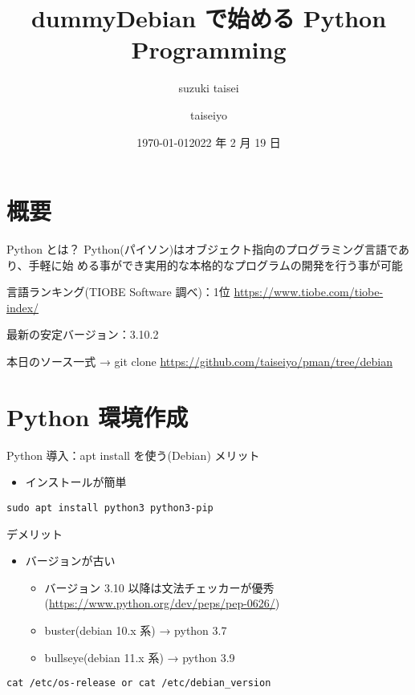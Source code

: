 \documentclass[compress,dvipdfmx,11pt]{beamer}
\author{suzuki taisei}
\date{\today}
\title{dummy}
\title[2022 年度 2 月 Debian 勉強会]{\bf Debian で始める Python Programming}
\author[]{taiseiyo}
\institute{Mail Address: taiseiyo11@gmail.com}
\date{2022 年 2 月 19 日}
\begin{document}
\maketitle
\newcommand{\pivec}{\mathbf \pi}
\newcommand{\xvec}{\mathbf x}
\newcommand{\yvec}{\mathbf y}
\newcommand{\zvec}{\mathbf z}
\newcommand{\Emat}{\mathbf E}
\newcommand{\Imat}{\mathbf I}

\section{概要}
\label{sec:org03770a9}
\begin{frame}[label={sec:org8821d8e}]{Python とは？}
Python(パイソン)はオブジェクト指向のプログラミング言語であり、手軽に始
める事ができ実用的な本格的なプログラムの開発を行う事が可能


言語ランキング(TIOBE Software 調べ)：1位
\url{https://www.tiobe.com/tiobe-index/}


最新の安定バージョン：3.10.2


本日のソース一式
→ git clone \url{https://github.com/taiseiyo/pman/tree/debian}
\end{frame}

\section{Python 環境作成}
\label{sec:org2865368}
\begin{frame}[label={sec:orgee2dd4b},fragile]{Python 導入：apt install を使う(Debian)}
 メリット
\begin{itemize}
\item インストールが簡単
\end{itemize}
\begin{verbatim}
sudo apt install python3 python3-pip
\end{verbatim}

デメリット
\begin{itemize}
\item バージョンが古い
\begin{itemize}
\item バージョン 3.10 以降は文法チェッカーが優秀(\url{https://www.python.org/dev/peps/pep-0626/})
\item buster(debian 10.x 系) → python 3.7
\item bullseye(debian 11.x 系) → python 3.9
\end{itemize}
\end{itemize}


\vspace{-2truemm}      
\begin{verbatim}
cat /etc/os-release or cat /etc/debian_version
\end{verbatim}
\end{frame}
\end{document}
